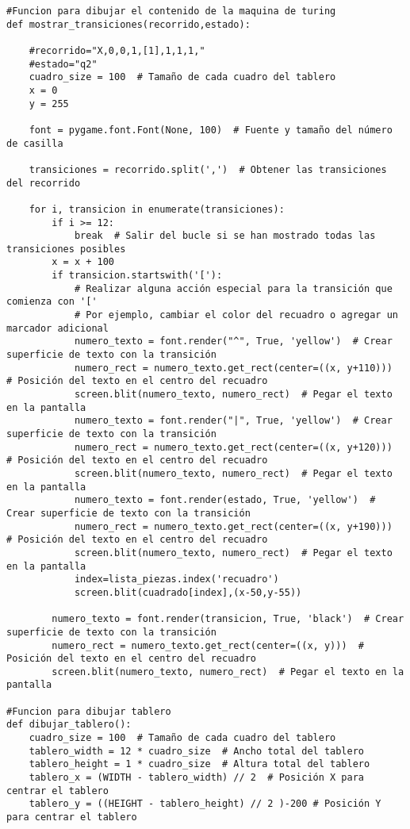 \begin{lstlisting}
#Funcion para dibujar el contenido de la maquina de turing
def mostrar_transiciones(recorrido,estado):
    
    #recorrido="X,0,0,1,[1],1,1,1,"
    #estado="q2"
    cuadro_size = 100  # Tamaño de cada cuadro del tablero
    x = 0
    y = 255
    
    font = pygame.font.Font(None, 100)  # Fuente y tamaño del número de casilla

    transiciones = recorrido.split(',')  # Obtener las transiciones del recorrido

    for i, transicion in enumerate(transiciones):
        if i >= 12:
            break  # Salir del bucle si se han mostrado todas las transiciones posibles
        x = x + 100
        if transicion.startswith('['):
            # Realizar alguna acción especial para la transición que comienza con '['
            # Por ejemplo, cambiar el color del recuadro o agregar un marcador adicional
            numero_texto = font.render("^", True, 'yellow')  # Crear superficie de texto con la transición
            numero_rect = numero_texto.get_rect(center=((x, y+110)))  # Posición del texto en el centro del recuadro
            screen.blit(numero_texto, numero_rect)  # Pegar el texto en la pantalla
            numero_texto = font.render("|", True, 'yellow')  # Crear superficie de texto con la transición
            numero_rect = numero_texto.get_rect(center=((x, y+120)))  # Posición del texto en el centro del recuadro
            screen.blit(numero_texto, numero_rect)  # Pegar el texto en la pantalla
            numero_texto = font.render(estado, True, 'yellow')  # Crear superficie de texto con la transición
            numero_rect = numero_texto.get_rect(center=((x, y+190)))  # Posición del texto en el centro del recuadro
            screen.blit(numero_texto, numero_rect)  # Pegar el texto en la pantalla
            index=lista_piezas.index('recuadro')
            screen.blit(cuadrado[index],(x-50,y-55))
            
        numero_texto = font.render(transicion, True, 'black')  # Crear superficie de texto con la transición
        numero_rect = numero_texto.get_rect(center=((x, y)))  # Posición del texto en el centro del recuadro
        screen.blit(numero_texto, numero_rect)  # Pegar el texto en la pantalla
 
#Funcion para dibujar tablero
def dibujar_tablero():
    cuadro_size = 100  # Tamaño de cada cuadro del tablero
    tablero_width = 12 * cuadro_size  # Ancho total del tablero
    tablero_height = 1 * cuadro_size  # Altura total del tablero
    tablero_x = (WIDTH - tablero_width) // 2  # Posición X para centrar el tablero
    tablero_y = ((HEIGHT - tablero_height) // 2 )-200 # Posición Y para centrar el tablero


\end{lstlisting}

